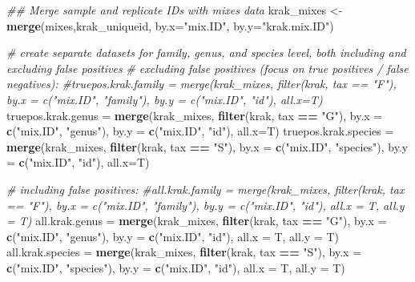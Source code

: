 \documentclass[
]{article}
\newenvironment{Shaded}{\begin{snugshade}}{\end{snugshade}}
\newcommand{\CommentTok}[1]{\textcolor[rgb]{0.56,0.35,0.01}{\textit{#1}}}
\newcommand{\DataTypeTok}[1]{\textcolor[rgb]{0.13,0.29,0.53}{#1}}
\newcommand{\KeywordTok}[1]{\textcolor[rgb]{0.13,0.29,0.53}{\textbf{#1}}}
\newcommand{\NormalTok}[1]{#1}
\newcommand{\OperatorTok}[1]{\textcolor[rgb]{0.81,0.36,0.00}{\textbf{#1}}}
\newcommand{\StringTok}[1]{\textcolor[rgb]{0.31,0.60,0.02}{#1}}
\begin{document}
\begin{Shaded}
\begin{Highlighting}[]
\CommentTok{## Merge sample and replicate IDs with mixes data}
\NormalTok{krak_mixes <-}\StringTok{ }\KeywordTok{merge}\NormalTok{(mixes,krak_uniqueid, }\DataTypeTok{by.x=}\StringTok{"mix.ID"}\NormalTok{, }\DataTypeTok{by.y=}\StringTok{"krak.mix.ID"}\NormalTok{)}

\CommentTok{# create separate datasets for family, genus, and species level, both including and excluding false positives}
\CommentTok{# excluding false positives (focus on true positives / false negatives):}
\CommentTok{#truepos.krak.family =  merge(krak_mixes, filter(krak, tax == "F"), by.x = c("mix.ID", "family"), by.y = c("mix.ID", "id"), all.x=T)}
\NormalTok{truepos.krak.genus =}\StringTok{  }\KeywordTok{merge}\NormalTok{(krak_mixes, }\KeywordTok{filter}\NormalTok{(krak, tax }\OperatorTok{==}\StringTok{ "G"}\NormalTok{), }\DataTypeTok{by.x =} \KeywordTok{c}\NormalTok{(}\StringTok{"mix.ID"}\NormalTok{, }\StringTok{"genus"}\NormalTok{), }\DataTypeTok{by.y =} \KeywordTok{c}\NormalTok{(}\StringTok{"mix.ID"}\NormalTok{, }\StringTok{"id"}\NormalTok{), }\DataTypeTok{all.x=}\NormalTok{T)}
\NormalTok{truepos.krak.species =}\StringTok{  }\KeywordTok{merge}\NormalTok{(krak_mixes, }\KeywordTok{filter}\NormalTok{(krak, tax }\OperatorTok{==}\StringTok{ "S"}\NormalTok{), }\DataTypeTok{by.x =} \KeywordTok{c}\NormalTok{(}\StringTok{"mix.ID"}\NormalTok{, }\StringTok{"species"}\NormalTok{), }\DataTypeTok{by.y =} \KeywordTok{c}\NormalTok{(}\StringTok{"mix.ID"}\NormalTok{, }\StringTok{"id"}\NormalTok{), }\DataTypeTok{all.x=}\NormalTok{T)}

\CommentTok{# including false positives:}
\CommentTok{#all.krak.family =  merge(krak_mixes, filter(krak, tax == "F"), by.x = c("mix.ID", "family"), by.y = c("mix.ID", "id"), all.x = T, all.y = T)}
\NormalTok{all.krak.genus =}\StringTok{  }\KeywordTok{merge}\NormalTok{(krak_mixes, }\KeywordTok{filter}\NormalTok{(krak, tax }\OperatorTok{==}\StringTok{ "G"}\NormalTok{), }\DataTypeTok{by.x =} \KeywordTok{c}\NormalTok{(}\StringTok{"mix.ID"}\NormalTok{, }\StringTok{"genus"}\NormalTok{), }\DataTypeTok{by.y =} \KeywordTok{c}\NormalTok{(}\StringTok{"mix.ID"}\NormalTok{, }\StringTok{"id"}\NormalTok{), }\DataTypeTok{all.x =}\NormalTok{ T, }\DataTypeTok{all.y =}\NormalTok{ T)}
\NormalTok{all.krak.species =}\StringTok{  }\KeywordTok{merge}\NormalTok{(krak_mixes, }\KeywordTok{filter}\NormalTok{(krak, tax }\OperatorTok{==}\StringTok{ "S"}\NormalTok{), }\DataTypeTok{by.x =} \KeywordTok{c}\NormalTok{(}\StringTok{"mix.ID"}\NormalTok{, }\StringTok{"species"}\NormalTok{), }\DataTypeTok{by.y =} \KeywordTok{c}\NormalTok{(}\StringTok{"mix.ID"}\NormalTok{, }\StringTok{"id"}\NormalTok{), }\DataTypeTok{all.x =}\NormalTok{ T, }\DataTypeTok{all.y =}\NormalTok{ T)}
\end{Highlighting}
\end{Shaded}
\end{document}
